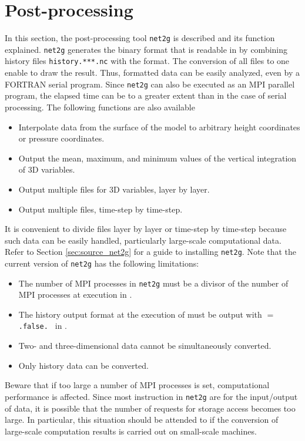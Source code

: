 \section{Post-processing} \label{sec:net2g}

In this section, the post-processing tool \verb|net2g| is described and its function explained. \verb|net2g| generates the binary format that is readable in \grads by combining history files \verb|history.***.nc| with the \netcdf format. The conversion of all files to one enable \grads to draw the result. Thus, formatted data can be easily analyzed, even by a FORTRAN serial program. Since \verb|net2g| can also be executed as an MPI parallel program, the elapsed time can be to a greater extent than in the case of serial processing. The following functions are also available
\begin{itemize}
 \item Interpolate data from the surface of the model to arbitrary height coordinates or pressure coordinates.
 \item Output the mean, maximum, and minimum values of the vertical integration of 3D variables.
 \item Output multiple files for 3D variables, layer by layer.
 \item Output multiple files, time-step by time-step.
\end{itemize}


It is convenient to divide files layer by layer or time-step by time-step because such data can be easily handled, particularly large-scale computational data. Refer to Section \ref{sec:source_net2g} for a guide to installing \verb|net2g|. Note that the current version of \verb|net2g| has the following limitations:
\begin{itemize}
\item The number of MPI processes in \verb|net2g| must be a divisor of the number of MPI processes at execution in \scalerm.
\item The history output format at the execution of \scalerm must be output with    $=$ \verb|.false. | in .
\item Two- and three-dimensional data cannot be simultaneously converted.
\item Only history data can be converted.
\end{itemize}
Beware that if too large a number of MPI processes is set, computational performance is affected. Since most instruction in \verb|net2g| are for the input/output of data, it is possible that the number of requests for storage access becomes too large. In particular, this situation should be attended to if the conversion of large-scale computation results is carried out on small-scale machines.

